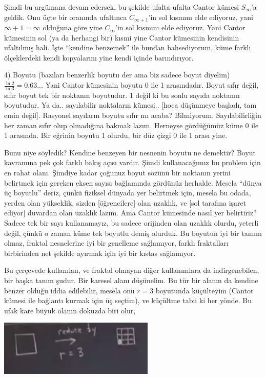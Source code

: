 \documentclass[12pt,fleqn]{article}\usepackage{../../common}
\begin{document}
Şimdi bu argümana devam edersek, bu şekilde ufalta ufalta Cantor kümesi
$S_\infty$'a geldik. Onu üçte bir oranında ufaltınca $C_{\infty+1}$'in sol
kısmını elde ediyoruz, yani $\infty+1 = \infty$ olduğuna göre yine
$C_\infty$'in sol kısmını elde ediyoruz. Yani Cantor kümesinin sol (ya da
herhangi bir) kısmi yine Cantor kümesinin kendisinin ufaltılmış hali. İşte
``kendine benzemek'' ile bundan bahsediyorum, küme farklı ölçeklerdeki
kendi kopyalarını yine kendi içinde barındırıyor.

4) Boyutu (bazıları benzerlik boyutu der ama biz sadece boyut diyelim)
$\frac{\ln 2}{\ln 3} = 0.63..$. Yani Cantor kümesinin boyutu 0 ile 1
arasındadır. Boyut sıfır değil, sıfır boyut tek bir noktanın boyutudur. 1
değil ki bu sonlu sayıda noktanın boyutudur. Ya da.. sayılabilir noktaların
kümesi.. [hoca düşünmeye başladı, tam emin değil]. Rasyonel sayıların
boyutu sıfır mı acaba? Bilmiyorum. Sayılabilirliğin her zaman sıfır olup
olmadığına bakmak lazım. Herneyse gördüğümüz küme 0 ile 1 arasında. Bir
eğrinin boyutu 1 olurdu, bir düz çizgi 0 ile 1 arası yine.

Bunu niye söyledik? Kendine benzeyen bir nesnenin boyutu ne demektir? Boyut
kavramına pek çok farklı bakış açısı vardır. Şimdi kullanacağımız bu
problem için en rahat olanı. Şimdiye kadar çoğunuz boyut sözünü bir
noktanın yerini belirtmek için gereken eksen sayısı bağlamında gördünüz
herhalde. Mesela ``dünya üç boyutlu'' deriz, çünkü fiziksel dünyada yer
belirtmek için, mesela bu odada, yerden olan yükseklik, sizden
[öğrencilere] olan uzaklık, ve [sol tarafına işaret ediyor] duvardan olan
uzaklık lazım. Ama Cantor kümesinde nasıl yer belirtiriz? Sadece tek bir
sayı kullanamayız, bu sadece orijinden olan uzaklık olurdu, yeterli değil,
çünkü o zaman küme tek boyutlu demiş olurduk. Bu boyutun iyi bir tanımı
olmaz, fraktal nesnelerine iyi bir genelleme sağlamıyor, farklı fraktalları
birbirinden net şekilde ayırmak için iyi bir kıstas sağlamıyor.

Bu çerçevede kullanılan, ve fraktal olmayan diğer kullanımlara da
indirgenebilen, bir başka tanım şudur. Bir karesel alanı düşünelim. Bu tür
bir alanın da kendine benzer olduğu iddia edilebilir, mesela onu $r = 3$
boyutunda küçülteyim (Cantor kümesi ile bağlantı kurmak için üç seçtim), ve
küçültme tabii ki her yönde. Bu ufak kare büyük olanın dokuzda biri olur,

\includegraphics[width=20em]{23_30.png}
\end{document}
